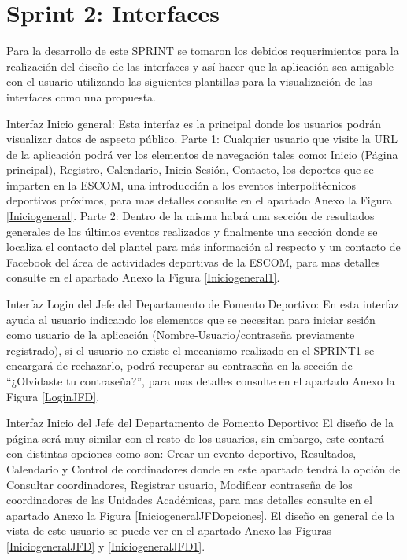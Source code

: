 	\section{Sprint 2: Interfaces}
	\noindent Para la desarrollo de este SPRINT se tomaron los debidos requerimientos para la realización del diseño de las interfaces y así hacer que la aplicación sea amigable con el usuario utilizando las siguientes plantillas para la visualización de las interfaces como una propuesta.
	\newline
	
	\noindent Interfaz Inicio general: Esta interfaz es la principal donde los usuarios podrán visualizar datos de aspecto público. 
	\newline
	Parte 1:
	Cualquier usuario que visite la URL de la aplicación podrá ver los elementos de navegación tales como: Inicio (Página principal), Registro, Calendario, Inicia Sesión, Contacto, los deportes que se imparten en la ESCOM, una introducción a los eventos interpolitécnicos deportivos próximos, para mas detalles consulte en el apartado Anexo la Figura \ref{Iniciogeneral}.
	\newline
	Parte 2:
	Dentro de la misma habrá una sección de resultados generales de los últimos eventos realizados y finalmente una  sección donde se localiza el contacto del plantel para más información al respecto y un contacto de Facebook del área de actividades deportivas de la ESCOM, para mas detalles consulte en el apartado Anexo la Figura \ref{Iniciogeneral1}.
	\newline
	
	\noindent Interfaz Login del Jefe del Departamento de Fomento Deportivo: En esta interfaz ayuda al usuario indicando los elementos que se necesitan para iniciar sesión como usuario de la aplicación (Nombre-Usuario/contraseña previamente registrado), si el usuario no existe el mecanismo realizado en el SPRINT1 se encargará de rechazarlo, podrá recuperar su contraseña en la sección de “¿Olvidaste tu contraseña?”, para mas detalles consulte en el apartado Anexo la Figura 	\ref{LoginJFD}. 
	\newline
	
	\noindent Interfaz Inicio del Jefe del Departamento de Fomento Deportivo: El diseño de la página será muy similar con el resto de los usuarios, sin embargo, este contará con distintas opciones como son: Crear un evento deportivo, Resultados, Calendario y Control de cordinadores donde en este apartado tendrá la opción de Consultar coordinadores, Registrar usuario, Modificar contraseña de los coordinadores de las Unidades Académicas, para mas detalles consulte en el apartado Anexo la Figura 	\ref{IniciogeneralJFDopciones}. El diseño en general de la vista de este usuario se puede ver en el apartado Anexo las Figuras \ref{IniciogeneralJFD} y \ref{IniciogeneralJFD1}.
	\newline
	
